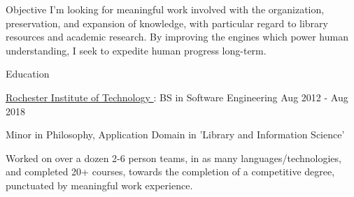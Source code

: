 \documentclass{resume} %
\begin{document}
  \begin{rSection}{Objective}
    I'm looking for meaningful work involved with the organization, preservation, and expansion of knowledge, with particular regard to library resources and academic research. By improving the engines which power human understanding, I seek to expedite human progress long-term.
  \end{rSection}

  \begin{rSection}{Education}

    \begin{rSubsection}{\underline{Rochester Institute of Technology }: BS in Software Engineering }{ Aug 2012 - Aug 2018 }{}

      \item Minor in Philosophy, Application Domain in 'Library and Information Science'

      \item Worked on over a dozen 2-6 person teams, in as many languages/technologies, and completed 20+ courses, towards the completion of a competitive degree, punctuated by meaningful work experience.

    \end{rSubsection}

  \end{rSection}
\end{document}
